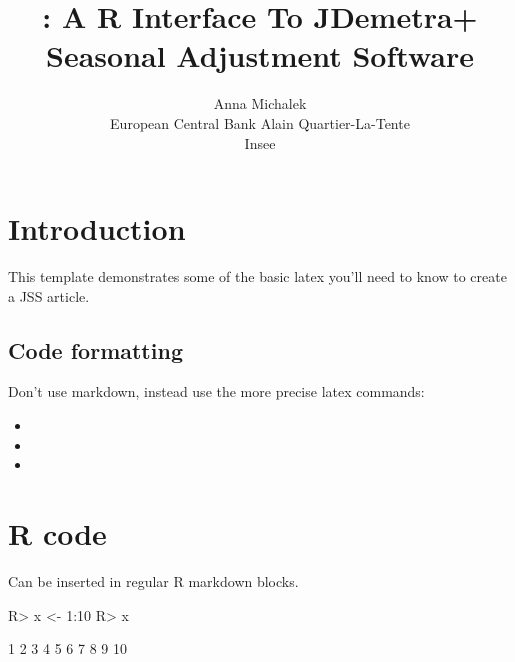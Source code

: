 \documentclass[article]{jss}
\author{
Anna Michalek\\European Central Bank \And Alain Quartier-La-Tente\\Insee
}
\title{\pkg{RJDemetra}: A R Interface To JDemetra+ Seasonal Adjustment Software}
\begin{document}
\hypertarget{introduction}{%
\section{Introduction}\label{introduction}}

This template demonstrates some of the basic latex you'll need to know
to create a JSS article.

\hypertarget{code-formatting}{%
\subsection{Code formatting}\label{code-formatting}}

Don't use markdown, instead use the more precise latex commands:

\begin{itemize}
\item
\item
\item
\end{itemize}

\hypertarget{r-code}{%
\section{R code}\label{r-code}}

Can be inserted in regular R markdown blocks.

\begin{CodeChunk}

\begin{CodeInput}
R> x <- 1:10
R> x
\end{CodeInput}

\begin{CodeOutput}
 [1]  1  2  3  4  5  6  7  8  9 10
\end{CodeOutput}
\end{CodeChunk}
\end{document}
